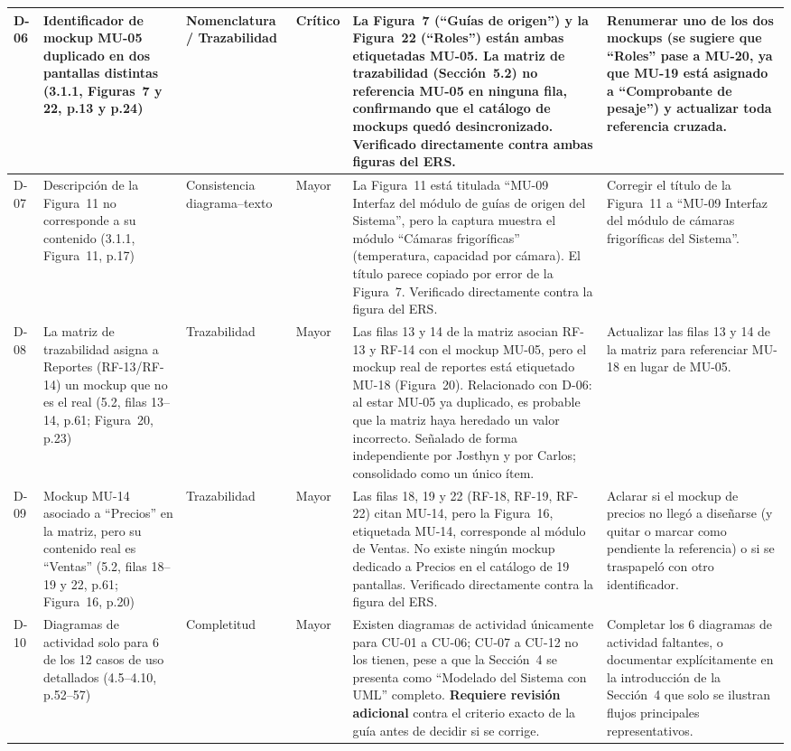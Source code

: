 \documentclass[11pt,a4paper]{article}
\begin{document}
\begin{longtable}{|p{0.6cm}|p{3cm}|p{2.5cm}|p{0.9cm}|p{4.3cm}|p{1.8cm}|}
\hline
D-06 & Identificador de mockup MU-05 duplicado en dos pantallas distintas (3.1.1, Figuras~7 y 22, p.13 y p.24) & Nomenclatura / Trazabilidad & \textbf{Crítico} & La Figura~7 (``Guías de origen'') y la Figura~22 (``Roles'') están ambas etiquetadas MU-05. La matriz de trazabilidad (Sección~5.2) no referencia MU-05 en ninguna fila, confirmando que el catálogo de mockups quedó desincronizado. Verificado directamente contra ambas figuras del ERS. & Renumerar uno de los dos mockups (se sugiere que ``Roles'' pase a MU-20, ya que MU-19 está asignado a ``Comprobante de pesaje'') y actualizar toda referencia cruzada. \\
\hline
D-07 & Descripción de la Figura~11 no corresponde a su contenido (3.1.1, Figura~11, p.17) & Consistencia diagrama--texto & Mayor & La Figura~11 está titulada ``MU-09 Interfaz del módulo de guías de origen del Sistema'', pero la captura muestra el módulo ``Cámaras frigoríficas'' (temperatura, capacidad por cámara). El título parece copiado por error de la Figura~7. Verificado directamente contra la figura del ERS. & Corregir el título de la Figura~11 a ``MU-09 Interfaz del módulo de cámaras frigoríficas del Sistema''. \\
\hline
D-08 & La matriz de trazabilidad asigna a Reportes (RF-13/RF-14) un mockup que no es el real (5.2, filas 13--14, p.61; Figura~20, p.23) & Trazabilidad & Mayor & Las filas 13 y 14 de la matriz asocian RF-13 y RF-14 con el mockup MU-05, pero el mockup real de reportes está etiquetado MU-18 (Figura~20). Relacionado con D-06: al estar MU-05 ya duplicado, es probable que la matriz haya heredado un valor incorrecto. Señalado de forma independiente por Josthyn y por Carlos; consolidado como un único ítem. & Actualizar las filas 13 y 14 de la matriz para referenciar MU-18 en lugar de MU-05. \\
\hline
D-09 & Mockup MU-14 asociado a ``Precios'' en la matriz, pero su contenido real es ``Ventas'' (5.2, filas 18--19 y 22, p.61; Figura~16, p.20) & Trazabilidad & Mayor & Las filas 18, 19 y 22 (RF-18, RF-19, RF-22) citan MU-14, pero la Figura~16, etiquetada MU-14, corresponde al módulo de Ventas. No existe ningún mockup dedicado a Precios en el catálogo de 19 pantallas. Verificado directamente contra la figura del ERS. & Aclarar si el mockup de precios no llegó a diseñarse (y quitar o marcar como pendiente la referencia) o si se traspapeló con otro identificador. \\
\hline
D-10 & Diagramas de actividad solo para 6 de los 12 casos de uso detallados (4.5--4.10, p.52--57) & Completitud & Mayor & Existen diagramas de actividad únicamente para CU-01 a CU-06; CU-07 a CU-12 no los tienen, pese a que la Sección~4 se presenta como ``Modelado del Sistema con UML'' completo. \textbf{Requiere revisión adicional} contra el criterio exacto de la guía antes de decidir si se corrige. & Completar los 6 diagramas de actividad faltantes, o documentar explícitamente en la introducción de la Sección~4 que solo se ilustran flujos principales representativos. \\

\end{longtable}
\end{document}
